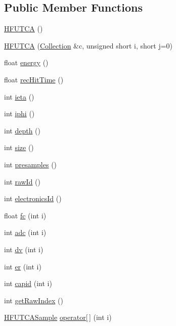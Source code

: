 \subsection*{Public Member Functions}
\begin{DoxyCompactItemize}
\item 
\hyperlink{class_h_f_u_t_c_a_a0cc9c566e0fa2b88ad276d11c1880ad1}{H\+F\+U\+T\+C\+A} ()
\item 
\hyperlink{class_h_f_u_t_c_a_a3125a07b0596172705e8d5def8bc8e7e}{H\+F\+U\+T\+C\+A} (\hyperlink{class_collection}{Collection} \&c, unsigned short i, short j=0)
\item 
float \hyperlink{class_h_f_u_t_c_a_adf5d3f041e1e3a43e5576b6ddcf2ad48}{energy} ()
\item 
float \hyperlink{class_h_f_u_t_c_a_a7279e3a34a60e5da92e280c4f3870cb1}{rec\+Hit\+Time} ()
\item 
int \hyperlink{class_h_f_u_t_c_a_a8a767e2e7844a50f4865041e77fbbfe1}{ieta} ()
\item 
int \hyperlink{class_h_f_u_t_c_a_ab2685221ef4d3dacbff49b066d23c662}{iphi} ()
\item 
int \hyperlink{class_h_f_u_t_c_a_a91cb1d88b08224209e156740b916ebf1}{depth} ()
\item 
int \hyperlink{class_h_f_u_t_c_a_aaecaeda5eb484331c5c8fe90fd1e94ac}{size} ()
\item 
int \hyperlink{class_h_f_u_t_c_a_a013df46d2ee37fde04c3e57fb769c248}{presamples} ()
\item 
int \hyperlink{class_h_f_u_t_c_a_a205ccadc5b455b7944b1a76d7da32d09}{raw\+Id} ()
\item 
int \hyperlink{class_h_f_u_t_c_a_abce0c33f0953b586c40e60741f8abf18}{electronics\+Id} ()
\item 
float \hyperlink{class_h_f_u_t_c_a_a71dcf59339d2814e52df6236f99d8a8c}{fc} (int i)
\item 
int \hyperlink{class_h_f_u_t_c_a_ad7540b3f782bf6fecc3d00ffd8432337}{adc} (int i)
\item 
int \hyperlink{class_h_f_u_t_c_a_a4f9ae85d537a4642d5a378c9993967c0}{dv} (int i)
\item 
int \hyperlink{class_h_f_u_t_c_a_aac6d122fbe8df975f2e4bf2dea3c4490}{er} (int i)
\item 
int \hyperlink{class_h_f_u_t_c_a_a8e7fc84c98fbce60f4a5fd5a94087ba3}{capid} (int i)
\item 
int \hyperlink{class_h_f_u_t_c_a_abb00d0d1c62b7db927d9eabb3e3543d7}{get\+Raw\+Index} ()
\item 
\hyperlink{class_h_f_u_t_c_a_sample}{H\+F\+U\+T\+C\+A\+Sample} \hyperlink{class_h_f_u_t_c_a_a9731b5cddb30d2924b16d6abd1f3a150}{operator\mbox{[}$\,$\mbox{]}} (int i)
\end{DoxyCompactItemize}
